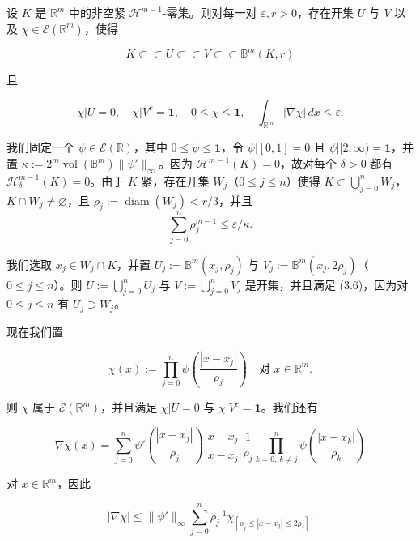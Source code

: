 \begin{lemma}

设 $ K $ 是 $ \mathbb{R}^m $ 中的非空紧 $ \mathcal{H}^{m-1} $-零集。则对每一对 $ \varepsilon, r > 0 $，存在开集 $ U $ 与 $ V $ 以及 $ \chi \in \mathcal{E}(\mathbb{R}^m) $，使得

\begin{equation}
K \subset\subset U \subset\subset V \subset\subset \mathbb{B}^m(K,r)\tag{3.6}
\end{equation}

且

\begin{equation}
\chi|U = 0 , \quad \chi|V^c = \mathbf{1} , \quad 0 \le \chi \le \mathbf{1} , \quad \int_{\mathbb{R}^m} |\nabla\chi| \, dx \le \varepsilon .\tag{3.7}
\end{equation}

\proofhead
我们固定一个 $ \psi \in \mathcal{E}(\mathbb{R}) $，其中 $ 0 \le \psi \le \mathbf{1} $，令 $ \psi|[0,1] = 0 $ 且 $ \psi|[2,\infty) = \mathbf{1} $，并置 $ \kappa := 2^m\operatorname{vol}(\mathbb{B}^m)\|\psi'\|_\infty $。因为 $ \mathcal{H}^{m-1}(K) = 0 $，故对每个 $ \delta > 0 $ 都有 $ \mathcal{H}^{m-1}_\delta(K) = 0 $。由于 $ K $ 紧，存在开集 $ W_j $（$ 0 \le j \le n $）使得 $ K \subset \bigcup_{j=0}^{n} W_j $，$ K \cap W_j \neq \varnothing $，且 $ \rho_j := \operatorname{diam}(W_j) < r/3 $，并且
\begin{equation}
\sum_{j=0}^{n}\rho_j^{m-1} \le \varepsilon/\kappa .\tag{3.8}
\end{equation}

我们选取 $ x_j \in W_j \cap K $，并置 $ U_j := \mathbb{B}^m(x_j,\rho_j) $ 与 $ V_j := \mathbb{B}^m(x_j,2\rho_j) $（$ 0 \le j \le n $）。则 $ U := \bigcup_{j=0}^{n}U_j $ 与 $ V := \bigcup_{j=0}^{n}V_j $ 是开集，并且满足 (3.6)，因为对 $ 0 \le j \le n $ 有 $ U_j \supset W_j $。

现在我们置

\[
\chi(x) := \prod_{j=0}^{n}\psi\left(\frac{|x-x_j|}{\rho_j}\right) \quad \text{对 } x \in \mathbb{R}^m .
\]

则 $ \chi $ 属于 $ \mathcal{E}(\mathbb{R}^m) $，并且满足 $ \chi|U = 0 $ 与 $ \chi|V^c = \mathbf{1} $。我们还有

\[
\nabla\chi(x) = \sum_{j=0}^{n}\psi'\left(\frac{|x-x_j|}{\rho_j}\right)\frac{x-x_j}{|x-x_j|}\frac{1}{\rho_j}\prod_{k=0,\,k\neq j}^{n}\psi\left(\frac{|x-x_k|}{\rho_k}\right)
\]

对 $ x \in \mathbb{R}^m $，因此

\[
|\nabla\chi| \le \|\psi'\|_\infty \sum_{j=0}^{n}\rho_j^{-1}\chi_{[\rho_j \le |x-x_j| \le 2\rho_j]} .
\]


\end{lemma}

